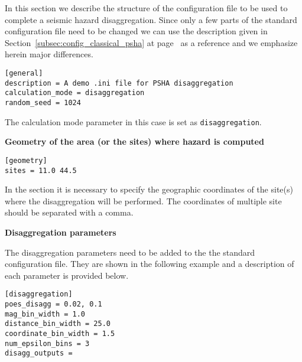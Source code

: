 In this section we describe the structure of the configuration file to be used
to complete a seismic hazard disaggregation. Since only a few parts of the
standard configuration file need to be changed we can use the description
given in Section~\ref{subsec:config_classical_psha} at
page~\pageref{subsec:config_classical_psha} as a reference and we emphasize
herein major differences.

\begin{verbatim}
[general]
description = A demo .ini file for PSHA disaggregation
calculation_mode = disaggregation
random_seed = 1024
\end{verbatim}

The calculation mode parameter in this case is set as
\texttt{disaggregation}.

\textbf{Geometry of the area (or the sites) where hazard is computed}

\begin{verbatim}
[geometry]
sites = 11.0 44.5
\end{verbatim}

In the section it is necessary to specify the geographic coordinates of
the site(s) where the disaggregation will be performed. The coordinates
of multiple site should be separated with a comma.

\textbf{Disaggregation parameters}

The disaggregation parameters need to be added to the the standard
configuration file. They are shown in the following example and a description
of each parameter is provided below.

\begin{verbatim}
[disaggregation]
poes_disagg = 0.02, 0.1
mag_bin_width = 1.0
distance_bin_width = 25.0
coordinate_bin_width = 1.5
num_epsilon_bins = 3
disagg_outputs =
\end{verbatim}

